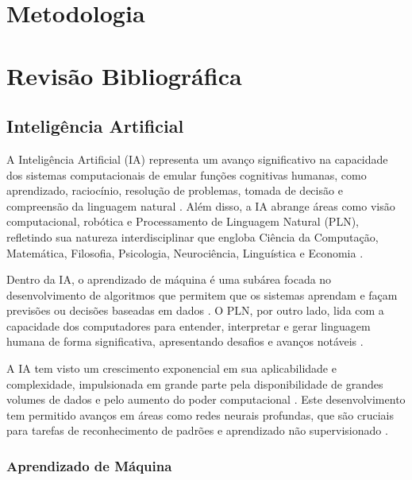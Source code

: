 \documentclass[conference]{IEEEtran}
\begin{document}
\section{Metodologia}




\section{Revisão Bibliográfica}

\subsection{Inteligência Artificial}
A Inteligência Artificial (IA) representa um avanço significativo na capacidade 
dos sistemas computacionais de emular funções cognitivas humanas, como 
aprendizado, raciocínio, resolução de problemas, tomada de decisão 
e compreensão da linguagem natural \cite{Russell2016}. 
Além disso, a IA abrange áreas como visão computacional, robótica e 
Processamento de Linguagem Natural (PLN), refletindo sua natureza interdisciplinar 
que engloba Ciência da Computação, Matemática, Filosofia, Psicologia, 
Neurociência, Linguística e Economia \cite{Poole2010}.

Dentro da IA, o aprendizado de máquina é uma subárea focada no desenvolvimento de 
algoritmos que permitem que os sistemas aprendam e 
façam previsões ou decisões baseadas em dados \cite{Alpaydin2020}. 
O PLN, por outro lado, lida com a capacidade dos computadores para entender, 
interpretar e gerar linguagem humana de forma significativa, 
apresentando desafios e avanços notáveis \cite{Jurafsky2020}.

A IA tem visto um crescimento exponencial em sua aplicabilidade e complexidade, 
impulsionada em grande parte pela disponibilidade de grandes volumes de dados e 
pelo aumento do poder computacional \cite{Goodfellow2016}. 
Este desenvolvimento tem permitido avanços em áreas como redes neurais profundas, 
que são cruciais para tarefas de reconhecimento de padrões 
e aprendizado não supervisionado \cite{LeCun2015}.

\subsubsection{Aprendizado de Máquina} 
\end{document}
